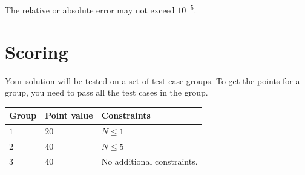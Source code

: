 The relative or absolute error may not exceed $10^{-5}$.

\section*{Scoring}
Your solution will be tested on a set of test case groups.
To get the points for a group, you need to pass all the test cases in the group.

\noindent
\begin{tabular}{| l | l | p{12cm} |}
  \hline
  \textbf{Group} & \textbf{Point value} & \textbf{Constraints} \\ \hline
  $1$    & $20$        & $N \le 1$ \\ \hline 
  $2$    & $40$        & $N \le 5$ \\ \hline
  $3$    & $40$        & No additional constraints. \\ \hline
\end{tabular}

